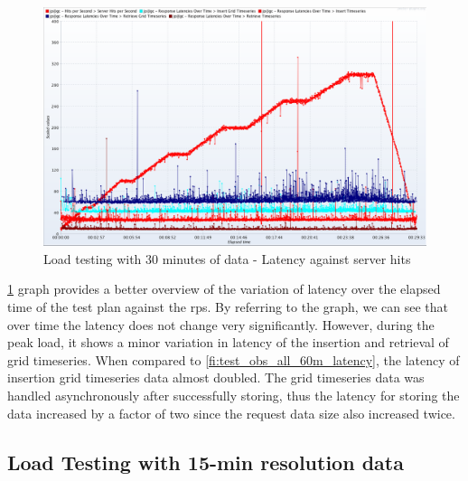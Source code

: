\begin{figure}[htp]
    \centering
    \includegraphics[width=1.0\textwidth]{results/obs/all/obs_all_30m_res_latencies_against_hits.png}
    \caption{Load testing with 30 minutes of data - Latency against server hits}
    \label{fi:test_obs_all_30m_latency}
\end{figure}
\cref{fi:test_obs_all_30m_latency} graph provides a better overview of the variation of latency over the elapsed time of the test plan against the \acrshort{rps}. By referring to the graph, we can see that over time the latency does not change very significantly. However, during the peak load, it shows a minor variation in latency of the insertion and retrieval of grid timeseries. When compared to \cref{fi:test_obs_all_60m_latency}, the latency of insertion grid timeseries data almost doubled. The grid timeseries data was handled asynchronously after successfully storing, thus the latency for storing the data increased by a factor of two since the request data size also increased twice.


\subsection{Load Testing with 15-min resolution data}
\label{subse:obs_test_plan_all_15min}

